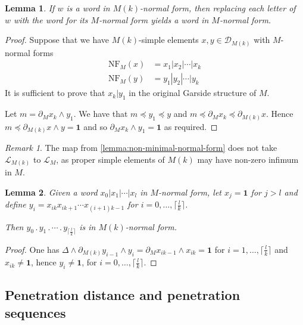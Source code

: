 \documentclass[a4paper,final]{article}
\theoremstyle{plain}
\newtheorem{lemma}[lemma]{Lemma}
\theoremstyle{remark}
\newtheorem*{remark}{Remark}
\theoremstyle{definition}
\begin{document}
\begin{lemma} \label{lemma:non-minimal-normal-form}
  If $w$ is a word in $M(k)$-normal form, then replacing each letter of~$w$
  with the word for its $M$-normal form yields a word in $M$-normal form.
\end{lemma}
\begin{proof}
  Suppose that we have $M(k)$-simple elements $x, y \in {\mathcal{D}}_{M(k)}$ with $M$-normal forms
  \begin{align*}
    {\mathrm{NF}}_M(x) &= x_1 |x_2 |\cdots |x_k \\
    {\mathrm{NF}}_M(y) &= y_1 |y_2 |\cdots |y_k
  \end{align*}
  It is sufficient to prove that $x_k | y_1$ in the original Garside structure of $M$.

  Let $m = {\partial}_M x_k {\wedge} y_1$.  We have that $m {\preccurlyeq} y_1
  {\preccurlyeq} y$ and $m {\preccurlyeq} {\partial}_M x_k {\preccurlyeq}
  {\partial}_{M(k)} x$.  Hence $m {\preccurlyeq} {\partial}_{M(k)} x {\wedge}
  y = {\mathbf{1}}$ and so ${\partial}_M x_k {\wedge} y_1 = {\mathbf{1}}$ as required.
\end{proof}

\begin{remark}
The map from \autoref{lemma:non-minimal-normal-form} does not take ${\mathcal{L}}_{M(k)}$ to ${\mathcal{L}}_M$, as proper
simple elements of $M(k)$ may have non-zero infimum in $M$.
\end{remark}

\begin{lemma} \label{lemma:normal-form-non-minimal}
  Given a word $x_0 | x_1 |\cdots| x_l$ in $M$-normal form, let $x_j={\mathbf{1}}$ for $j>l$ and define 
  $y_i = x_{ik} x_{ik + 1} \cdots x_{(i+1)k - 1}$ for $i=0,\ldots,\lceil\frac{l}{k}\rceil$.
  
  Then $y_0 {\mathbin{.}} y_1 {\mathbin{.}}\cdots {\mathbin{.}} y_{\lceil\frac{l}{k}\rceil}$ is in $M(k)$-normal form.
\end{lemma}
\begin{proof}
One has $\Delta {\wedge} {\partial}_{M(k)} y_{i-1} {\wedge} y_i = {\partial}_M x_{ik-1} {\wedge} x_{ik} = {\mathbf{1}}$ for $i=1,\ldots,\lceil\frac{l}{k}\rceil$ and $x_{ik}\neq{\mathbf{1}}$, hence $y_i\neq{\mathbf{1}}$, for $i=0,\ldots,\lceil\frac{l}{k}\rceil$.
\end{proof}

\subsection{Penetration distance and penetration sequences}\label{S:BackgroundPenetration}
\end{document}
